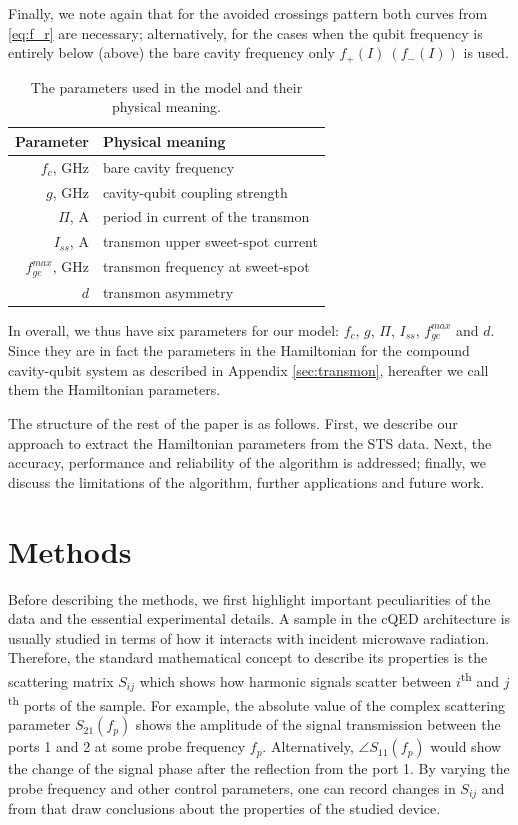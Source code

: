 \documentclass[%
 aip,
 draft,
 amsmath,amssymb,
 reprint,%
]{revtex4-1}
\begin{document}
Finally, we note again that for the avoided crossings pattern both curves from \eqref{eq:f_r} are necessary; alternatively, for the cases when the qubit frequency is entirely below (above) the bare cavity frequency only $ f_+(I)\ \left(f_-(I)\right)$ is used. 
\begin{table}
\begin{ruledtabular}
	\begin{tabular}{rl} 
		Parameter & Physical meaning \\ 
		\hline
		$f_c$, GHz & bare cavity frequency \\ 
		$g$, GHz & cavity-qubit coupling strength \\
		$\Pi$, A & period in current of the transmon \\
		$I_{ss}$, A & transmon upper sweet-spot current \\
		$f_{ge}^{max}$, GHz & transmon frequency at sweet-spot \\
		$d$& transmon asymmetry
	\end{tabular} 
\end{ruledtabular}
\caption{The parameters used in the model and their physical meaning.}
\label{tab:pars}
\end{table}
In overall, we thus have six parameters for our model: $f_c$, $g$, $\Pi$, $I_{ss}$, $f_{ge}^{max}$ and $d$. Since they are in fact the parameters in the Hamiltonian for the compound cavity-qubit system as described in Appendix \ref{sec:transmon}, hereafter we call them the Hamiltonian parameters.

The structure of the rest of the paper is as follows. First, we describe our approach to extract the Hamiltonian parameters from the STS data. Next, the accuracy, performance and reliability of the algorithm is addressed; finally, we discuss the limitations of the algorithm, further applications and future work. 



\section{Methods}

Before describing the methods, we first highlight important peculiarities of the data and the essential experimental details. A sample in the cQED architecture is usually studied in terms of how it interacts with incident microwave radiation. Therefore, the standard mathematical concept to describe its properties is the scattering matrix $S_{ij}$ which shows how harmonic signals scatter between $i$\textsuperscript{th} and $j$\textsuperscript{th} ports of the sample. For example, the absolute value of the complex scattering parameter $S_{21}(f_p)$ shows the amplitude of the signal transmission between the ports 1 and 2 at some probe frequency $f_p$. Alternatively, $\angle S_{11}(f_p)$ would show the change of the signal phase after the reflection from the port 1. By varying the probe frequency and other control parameters, one can record changes in $S_{ij}$ and from that draw conclusions about the properties of the studied device.
\end{document}
